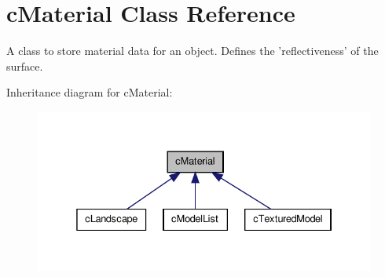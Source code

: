\hypertarget{classc_material}{
\section{cMaterial Class Reference}
\label{classc_material}
}


A class to store material data for an object. Defines the 'reflectiveness' of the surface.  




Inheritance diagram for cMaterial:
\nopagebreak
\begin{figure}[H]
\begin{center}
\leavevmode
\includegraphics[width=334pt]{classc_material__inherit__graph}
\end{center}
\end{figure}
